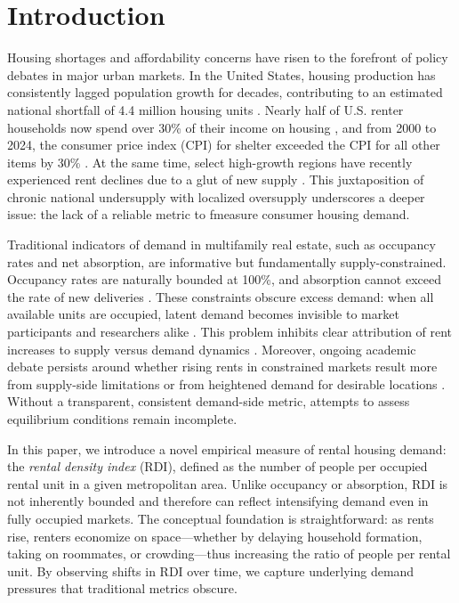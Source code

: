 \documentclass[APA,Times1COL]{WileyNJDv5} %
\begin{document}
\renewcommand\thefootnote{}

\renewcommand\thefootnote{\fnsymbol{footnote}}
\setcounter{footnote}{1}

\section{Introduction}\label{sec1}
Housing shortages and affordability concerns have risen to the forefront of policy debates in major urban markets. In the United States, housing production has consistently lagged population growth for decades, contributing to an estimated national shortfall of 4.4 million housing units \cite{betancourt2022us}. Nearly half of U.S. renter households now spend over 30\% of their income on housing \cite{censusNearlyHalf}, and from 2000 to 2024, the consumer price index (CPI) for shelter exceeded the CPI for all other items by 30\% \cite{stlouisfedConsumerPrice}. At the same time, select high-growth regions have recently experienced rent declines due to a glut of new supply \cite{mott2024ThisRegion}. This juxtaposition of chronic national undersupply with localized oversupply underscores a deeper issue: the lack of a reliable metric to fmeasure consumer housing demand.

Traditional indicators of demand in multifamily real estate, such as occupancy rates and net absorption, are informative but fundamentally supply-constrained. Occupancy rates are naturally bounded at 100\%, and absorption cannot exceed the rate of new deliveries \cite{mueller1999real}. These constraints obscure excess demand: when all available units are occupied, latent demand becomes invisible to market participants and researchers alike \cite{gabriel2001rental, sirmans1991determinants, pyhrr1999real}. This problem inhibits clear attribution of rent increases to supply versus demand dynamics \cite{pennington2021does, molloy2022housing}. Moreover, ongoing academic debate persists around whether rising rents in constrained markets result more from supply-side limitations \cite{saiz2010geographic} or from heightened demand for desirable locations \cite{davidoff2015supply}. Without a transparent, consistent demand-side metric, attempts to assess equilibrium conditions remain incomplete.

In this paper, we introduce a novel empirical measure of rental housing demand: the \textit{rental density index} (RDI), defined as the number of people per occupied rental unit in a given metropolitan area. Unlike occupancy or absorption, RDI is not inherently bounded and therefore can reflect intensifying demand even in fully occupied markets. The conceptual foundation is straightforward: as rents rise, renters economize on space---whether by delaying household formation, taking on roommates, or crowding---thus increasing the ratio of people per rental unit. By observing shifts in RDI over time, we capture underlying demand pressures that traditional metrics obscure.
\end{document}
